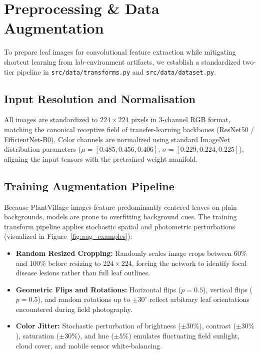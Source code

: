 \section{Preprocessing \& Data Augmentation}
\label{sec:preprocessing}

To prepare leaf images for convolutional feature extraction while mitigating shortcut learning from lab-environment artifacts, we establish a standardized two-tier pipeline in \texttt{src/data/transforms.py} and \texttt{src/data/dataset.py}.

\subsection{Input Resolution and Normalisation}
All images are standardized to $224 \times 224$ pixels in 3-channel RGB format, matching the canonical receptive field of transfer-learning backbones (ResNet50 / EfficientNet-B0). Color channels are normalized using standard ImageNet distribution parameters ($\mu = [0.485, 0.456, 0.406]$, $\sigma = [0.229, 0.224, 0.225]$), aligning the input tensors with the pretrained weight manifold.

\subsection{Training Augmentation Pipeline}
Because PlantVillage images feature predominantly centered leaves on plain backgrounds, models are prone to overfitting background cues. The training transform pipeline applies stochastic spatial and photometric perturbations (visualized in Figure~\ref{fig:aug_examples}):
\begin{itemize}
    \item \textbf{Random Resized Cropping:} Randomly scales image crops between 60\% and 100\% before resizing to $224 \times 224$, forcing the network to identify focal disease lesions rather than full leaf outlines.
    \item \textbf{Geometric Flips and Rotations:} Horizontal flips ($p=0.5$), vertical flips ($p=0.5$), and random rotations up to $\pm 30^{\circ}$ reflect arbitrary leaf orientations encountered during field photography.
    \item \textbf{Color Jitter:} Stochastic perturbation of brightness ($\pm 30\%$), contrast ($\pm 30\%$), saturation ($\pm 30\%$), and hue ($\pm 5\%$) emulates fluctuating field sunlight, cloud cover, and mobile sensor white-balancing.
\end{itemize}

